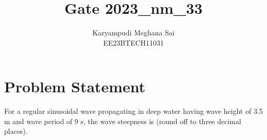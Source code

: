 \documentclass[12pt]{article}
\title{Gate 2023\_nm\_33}
\author{Karyampudi Meghana Sai \\
        EE23BTECH11031}
\begin{document}
\maketitle

\section*{Problem Statement}

For a regular sinusoidal wave propagating in deep water having wave height of 3.5 m and wave period of 9 s, the wave steepness is \underline{\hspace{1cm}} (round off to three decimal places).
\end{document}
